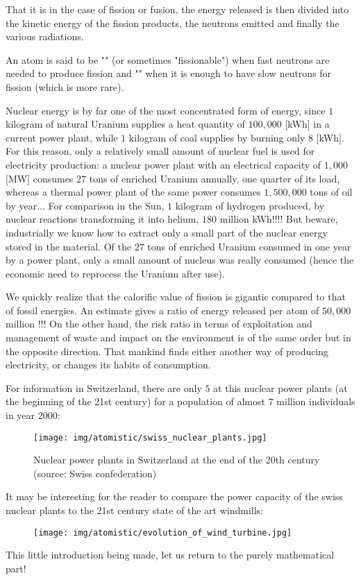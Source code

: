 	That it is in the case of fission or fusion, the energy released is then divided into the kinetic energy of the fission products, the neutrons emitted and finally the various radiations.
	\begin{tcolorbox}[title=Remark,colframe=black,arc=10pt]
	An atom is said to be "" (or sometimes "fissionable") when fast neutrons are needed to produce fission and "" when it is enough to have slow neutrons for fission (which is more rare).
	\end{tcolorbox}
	Nuclear energy is by far one of the most concentrated form of energy, since $1$ kilogram of natural Uranium supplies a heat quantity of $100,000$ [kWh] in a current power plant, while $1$ kilogram of coal supplies by burning only $8$ [kWh]. For this reason, only a relatively small amount of nuclear fuel is used for electricity production: a nuclear power plant with an electrical capacity of $1,000$ [MW] consumes $27$ tons of enriched Uranium annually, one quarter of its load, whereas a thermal power plant of the same power consumes $1,500,000$ tons of oil by year... For comparison in the Sun, $1$ kilogram of hydrogen produced, by nuclear reactions transforming it into helium, $180$ million kWh!!!! But beware, industrially we know how to extract only a small part of the nuclear energy stored in the material. Of the $27$ tons of enriched Uranium consumed in one year by a power plant, only a small amount of nucleus was really consumed (hence the economic need to reprocess the Uranium after use).

	We quickly realize that the calorific value of fission is gigantic compared to that of fossil energies. An estimate gives a ratio of energy released per atom of $50,000$ million !!! On the other hand, the risk ratio in terms of exploitation and management of waste and impact on the environment is of the same order but in the opposite direction. That mankind finds either another way of producing electricity, or changes its habits of consumption.

	For information in Switzerland, there are only $5$ at this nuclear power plants (at the beginning of the 21st century) for a population of almost $7$ million individuals in year 2000:
	 \begin{figure}[H]
		\centering
		\texttt{[image: img/atomistic/swiss\_nuclear\_plants.jpg]}
		\caption[Nuclear power plants in Switzerland at the end of the 20th century]{Nuclear power plants in Switzerland at the end of the 20th century (source: Swiss confederation)}
	\end{figure}
	It may be interesting for the reader to compare the power capacity of the swiss nuclear plants to the 21st century state of the art windmills:
	\begin{figure}[H]
		\centering
		\texttt{[image: img/atomistic/evolution\_of\_wind\_turbine.jpg]}
	\end{figure}
	This little introduction being made, let us return to the purely mathematical part!

